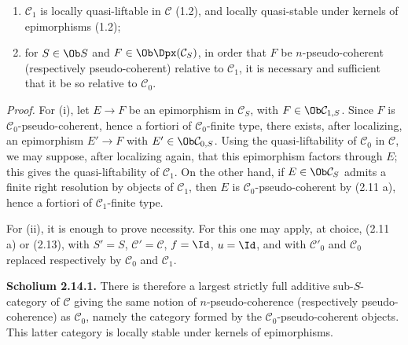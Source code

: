\begin{enumerate}[label=(\roman*)]
\item \(\mathcal C_1\) is locally quasi-liftable in \(\mathcal C\) (1.2), and locally quasi-stable under kernels of epimorphisms (1.2);
\item for \(S\in\Ob S\) and \(F\in\Ob\Dpx(\mathcal C_S)\), in order that \(F\) be \(n\)-pseudo-coherent (respectively pseudo-coherent) relative to \(\mathcal C_1\), it is necessary and sufficient that it be so relative to \(\mathcal C_0\).
\end{enumerate}

\emph{Proof.} For (i), let \(E\to F\) be an epimorphism in \(\mathcal C_S\), with \(F\in\Ob\mathcal C_{1,S}\). Since \(F\) is \(\mathcal C_0\)-pseudo-coherent, hence a fortiori of \(\mathcal C_0\)-finite type, there exists, after localizing, an epimorphism \(E'\to F\) with \(E'\in\Ob\mathcal C_{0,S}\). Using the quasi-liftability of \(\mathcal C_0\) in \(\mathcal C\), we may suppose, after localizing again, that this epimorphism factors through \(E\); this gives the quasi-liftability of \(\mathcal C_1\). On the other hand, if \(E\in\Ob\mathcal C_S\) admits a finite right resolution by objects of \(\mathcal C_1\), then \(E\) is \(\mathcal C_0\)-pseudo-coherent by (2.11 a), hence a fortiori of \(\mathcal C_1\)-finite type.

For (ii), it is enough to prove necessity. For this one may apply, at choice, (2.11 a) or (2.13), with \(S'=S\), \(\mathcal C'=\mathcal C\), \(f=\Id\), \(u=\Id\), and with \(\mathcal C'_0\) and \(\mathcal C_0\) replaced respectively by \(\mathcal C_0\) and \(\mathcal C_1\).

\textbf{Scholium 2.14.1.} There is therefore a largest strictly full additive sub-\(S\)-category of \(\mathcal C\) giving the same notion of \(n\)-pseudo-coherence (respectively pseudo-coherence) as \(\mathcal C_0\), namely the category formed by the \(\mathcal C_0\)-pseudo-coherent objects. This latter category is locally stable under kernels of epimorphisms.

